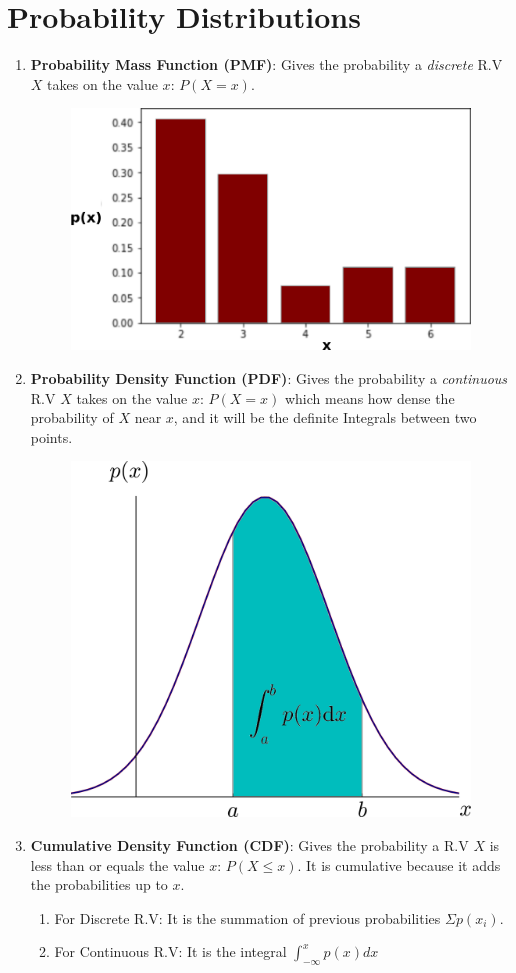 \documentclass[11pt, twocolumn]{article}
\begin{document}
\section{Probability Distributions}
\begin{enumerate}
\item \textbf{Probability Mass Function (PMF)}: Gives the probability a \textit{discrete} R.V $X$ takes on the value $x$: $P( X = x)$.
\begin{figure}[h!]
  \centering
  \includegraphics[width=0.7\linewidth]{figs/PMF.png}
\end{figure}
\item \textbf{Probability Density Function (PDF)}: Gives the probability a \textit{continuous} R.V $X$ takes on the value $x$: $P( X = x)$ which means how dense the probability of $X$ near $x$, and it will be the definite Integrals between two points.
\begin{figure}[h!]
  \centering
  \includegraphics[width=0.6\linewidth]{figs/PDF.png}
\end{figure}
\item \textbf{Cumulative Density Function (CDF)}: Gives the probability a R.V $X$ is less than or equals the value $x$: $P( X \leq x)$. It is  cumulative because it adds the probabilities up to $x$.
	\begin{enumerate}
	\item For Discrete R.V: It is the summation of previous probabilities $\Sigma p(x_i)$.
	\item For Continuous R.V: It is the integral $\int_{-\infty}^{x} p(x) dx$
	\end{enumerate}
\end{enumerate}
\end{document}

